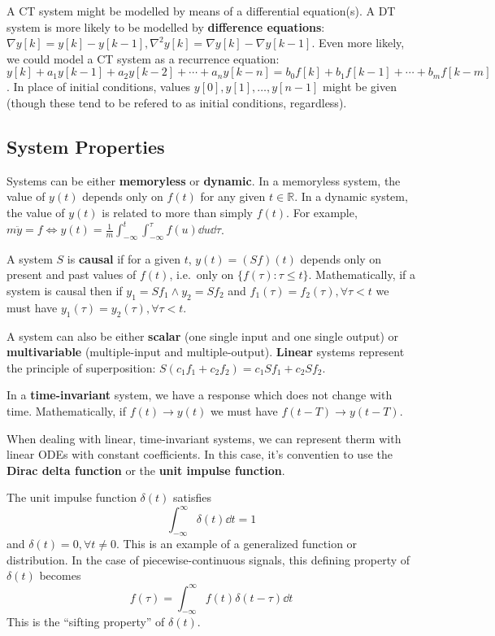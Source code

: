 \documentclass[12pt]{article}
\begin{document}
A CT system might be modelled by means of a differential equation(s). A DT system is more likely to be modelled by {\bf difference equations}: $\nabla y[k] = y[k] - y[k-1], \nabla^2 y[k] = \nabla y[k] - \nabla y[k-1]$. Even more likely, we could model a CT system as a recurrence equation: $y[k] + a_1y[k-1] + a_2y[k-2] + \cdots + a_n y[k-n] = b_0f[k] + b_1f[k-1] + \cdots + b_m f[k-m]$. In place of initial conditions, values $y[0], y[1], \dots, y[n-1]$ might be given (though these tend to be refered to as initial conditions, regardless).

\subsection{System Properties}
Systems can be either {\bf memoryless} or {\bf dynamic}. In a memoryless system, the value of $y(t)$ depends only on $f(t)$ for any given $t\in\mathbb{R}$. In a dynamic system, the value of $y(t)$ is related to more than simply $f(t)$. For example, $m \ddot y = f \iff y(t) = \frac{1}{m} \int_{-\infty}^t \int_{-\infty}^\tau f(u) \dd u \dd \tau$.

A system $S$ is {\bf causal} if for a given $t$, $y(t) = (Sf)(t)$ depends only on present and past values of $f(t)$, i.e.\ only on $\{ f(\tau) : \tau \leq t \}$. Mathematically, if a system is causal then if $y_1 = Sf_1 \land y_2 = Sf_2$ and $f_1(\tau) = f_2(\tau), \forall \tau < t$ we must have $y_1(\tau) = y_2(\tau), \forall \tau < t$.

A system can also be either {\bf scalar} (one single input and one single output) or {\bf multivariable} (multiple-input and multiple-output). {\bf Linear} systems represent the principle of superposition: $S(c_1f_1 + c_2f_2) = c_1Sf_1 + c_2Sf_2$.

In a {\bf time-invariant} system, we have a response which does not change with time. Mathematically, if $f(t) \to y(t)$ we must have $f(t-T) \to y(t-T)$.

When dealing with linear, time-invariant systems, we can represent therm with linear ODEs with constant coefficients. In this case, it's conventien to use the {\bf Dirac delta function} or the {\bf unit impulse function}.

The unit impulse function $\delta(t)$ satisfies \[ \int_{-\infty}^\infty \delta(t) \dd t = 1\] and $\delta(t) = 0, \forall t \neq 0$. This is an example of a generalized function or distribution. In the case of piecewise-continuous signals, this defining property of $\delta(t)$ becomes \[ f(\tau) = \int_{-\infty}^\infty f(t) \delta(t-\tau) \dd t \] This is the ``sifting property'' of $\delta(t)$.
\end{document}
